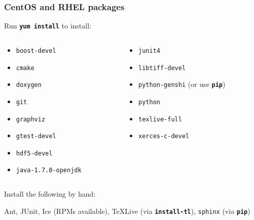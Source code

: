 \documentclass{beamer}
\newcommand{\cmd}[1]{\textbf{\texttt{#1}}}
\newcommand{\pkg}[1]{\texttt{#1}}
\begin{document}
\begin{frame}
  \frametitle{CentOS and RHEL packages}
  \scriptsize
  Run \cmd{yum install} to install:
  \begin{columns}
    \begin{column}{.5\linewidth}
      \begin{itemize}
      \item[] \pkg{boost-devel}
      \item[] \pkg{cmake}
      \item[] \pkg{doxygen}
      \item[] \pkg{git}
      \item[] \pkg{graphviz}
      \item[] \pkg{gtest-devel}
      \item[] \pkg{hdf5-devel}
      \item[] \pkg{java-1.7.0-openjdk}
      \end{itemize}
    \end{column}
    \begin{column}{.5\linewidth}
      \begin{itemize}
      \item[] \pkg{junit4}
      \item[] \pkg{libtiff-devel}
      \item[] \pkg{python-genshi} (or use \cmd{pip})
      \item[] \pkg{python}
      \item[] \pkg{texlive-full}
      \item[] \pkg{xerces-c-devel}
      \end{itemize}
    \end{column}
  \end{columns}
\bigskip
Install the following by hand:

Ant, JUnit, Ice (RPMs available),
\TeX{}Live (via \cmd{install-tl}),
\pkg{sphinx} (via \cmd{pip})
\end{frame}
\end{document}
